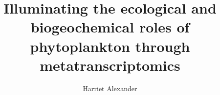 % 
% 
%
%
%
%
%
%
%
% 
% 

\title{Illuminating the ecological and biogeochemical roles of phytoplankton through metatranscriptomics}
\author{Harriet Alexander}


